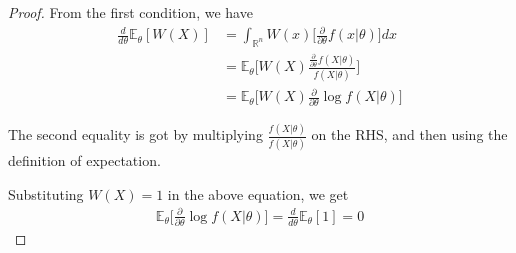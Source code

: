 \documentclass[12pt]{report}
\begin{document}
\begin{proof}
From the first condition, we have
\begin{align}
\frac{d}{d\theta}\mathbb{E}_\theta[W(X)] &= \int_{\mathbb{R}^n} W(x) \Big[\frac{\partial}{\partial \theta}f(x | \theta)\Big] dx \nonumber \\
&= \mathbb{E}_\theta \Big[ W(X) \frac{\frac{\partial}{\partial \theta}f(X | \theta)}{f(X | \theta)} \Big] \nonumber \\
&= \mathbb{E}_\theta \Big[ W(X) \frac{\partial}{\partial \theta}\log f(X | \theta) \Big]
\end{align}

The second equality is got by multiplying $\frac{f(X|\theta)}{f(X|\theta)}$ on the RHS, and then using the definition of expectation. %

Substituting $W(X) = 1$ in the above equation, we get
\begin{align}
\mathbb{E}_\theta \Big[\frac{\partial}{\partial \theta}\log f(X | \theta) \Big] = \frac{d}{d\theta} \mathbb{E}_\theta[1] = 0
\end{align}


\end{proof}
\end{document}

